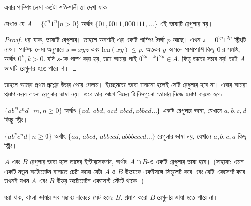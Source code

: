এবার পাম্পিং লেমা কতটা শক্তিশালী তা দেখা যাক।

\begin{example}
	দেখাও যে $A=\{0^n1^n|n> 0\}$ অর্থাৎ $\{01, 0011, 000111, \ldots\}$ এই ভাষাটি রেগুলার নয়।
\end{example}
\begin{proof}
	ধরা যাক, ভাষাটি রেগুলার। তাহলে অবশ্যই এর একটি পাম্পিং দৈর্ঘ্য $p$ আছে। এখন $s=0^{2p}1^{2p}$ স্ট্রিংটি নাও। পাম্পিং লেমা অনুসারে $s=xyz$ এবং $\text{len}(xy)\leq p$. অতএব $y$ আসলে পাশাপাশি কিছু $0$-র সমষ্টি, অর্থাৎ $0^k, k>0$. যদি $s$-কে পাম্প করা হয়, তবে আমরা পাই $0^{2p+k}1^{2p}\in A$. কিন্তু তাতো সম্ভব নয়! তাই $A$ ভাষাটি রেগুলার হতে পারে না।
\end{proof}

তাহলে আমরা প্রথম প্রশ্নের উত্তর পেয়ে গেলাম। ইচ্ছেমতো ভাষা বানানো হলেই সেটি রেগুলার হবে না। এবার আমরা প্রমাণ করব বাংলা রেগুলার ভাষা নয়। তবে তার আগে নিচের জিনিসগুলো তোমার নিজে প্রমাণ করতে হবে:
\begin{diybox}
	\begin{smartlist}
		\item $\{ab^mc^nd\ |\ m,n\ge 0\}$ অর্থাৎ $\{ad$, $abd$, $acd$ $abcd, abbcd\ldots\}$ একটি রেগুলার ভাষা, যেখানে $a,b,c,d$ কিছু স্ট্রিং।
		\item $\{ab^nc^nd\ |\ n\ge 0\}$ অর্থাৎ $\{ad$, $abcd$, $abbccd, abbbcccd\ldots\}$ রেগুলার ভাষা নয়, যেখানে $a,b,c,d$ কিছু স্ট্রিং।
		\item $A$ এবং $B$ রেগুলার ভাষা হলে তাদের ইন্টারসেকশন, অর্থাৎ $A\cap B$-ও একটি রেগুলার ভাষা হবে। (সাহায্য: এমন একটি নতুন অটোমেটন বানাতে চেষ্টা করো যেটা $A$ ও $B$ উভয়কে একইসঙ্গে সিমুলেট করে এবং যেটি একসেপ্ট করে তখনই যখন $A$ এবং $B$ উভয় অটোমেটন একসেপ্ট স্টেটে থাকে।)
	\end{smartlist}
\end{diybox}
\begin{example}
	ধরা যাক, বাংলা ভাষার সব সম্ভাব্য বাক্যের সেট হচ্ছে $B$. প্রমাণ করো $B$ রেগুলার ভাষা হতে পারে না।
\end{example}
